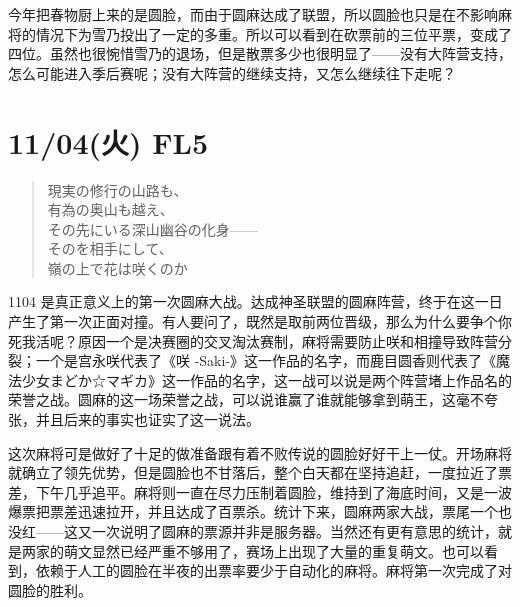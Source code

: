 今年把春物厨上来的是圆脸，而由于圆麻达成了联盟，所以圆脸也只是在不影响麻将的情况下为雪乃投出了一定的多重。所以可以看到在砍票前的三位平票，变成了四位。虽然也很惋惜雪乃的退场，但是散票多少也很明显了——没有大阵营支持，怎么可能进入季后赛呢；没有大阵营的继续支持，又怎么继续往下走呢？

\section{11/04(火) FL5}

\begin{quote}\kasho
現実の修行の山路も、\\
有為の奥山も越え、\\
その先にいる深山幽谷の化身——\\
そのを相手にして、\\
嶺の上で花は咲くのか
\end{quote}

1104 是真正意义上的第一次圆麻大战。达成神圣联盟的圆麻阵营，终于在这一日产生了第一次正面对撞。有人要问了，既然是取前两位晋级，那么为什么要争个你死我活呢？原因一个是决赛圈的交叉淘汰赛制，麻将需要防止咲和相撞导致阵营分裂；一个是宫永咲代表了《咲 -Saki-》这一作品的名字，而鹿目圆香则代表了《魔法少女まどか☆マギカ》这一作品的名字，这一战可以说是两个阵营堵上作品名的荣誉之战。圆麻的这一场荣誉之战，可以说谁赢了谁就能够拿到萌王，这毫不夸张，并且后来的事实也证实了这一说法。

这次麻将可是做好了十足的做准备跟有着不败传说的圆脸好好干上一仗。开场麻将就确立了领先优势，但是圆脸也不甘落后，整个白天都在坚持追赶，一度拉近了票差，下午几乎追平。麻将则一直在尽力压制着圆脸，维持到了海底时间，又是一波爆票把票差迅速拉开，并且达成了百票杀。统计下来，圆麻两家大战，票尾一个也没红——这又一次说明了圆麻的票源并非是服务器。当然还有更有意思的统计，就是两家的萌文显然已经严重不够用了，赛场上出现了大量的重复萌文。也可以看到，依赖于人工的圆脸在半夜的出票率要少于自动化的麻将。麻将第一次完成了对圆脸的胜利。


